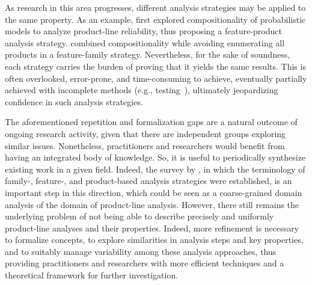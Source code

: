 As research in this area progresses, different analysis strategies may be applied to the same property. As an example, 
 \citet{Ghezzi2013} first explored compositionality of probabilistic models to analyze product-line reliability, thus proposing a feature-product analysis strategy. \citet{LANNA2017} combined compositionality while avoiding enumerating all products in a feature-family strategy.
Nevertheless, for the sake of soundness, each strategy carries the burden of proving that it yields the same results. This is often overlooked, error-prone, and time-consuming to achieve, eventually partially achieved with incomplete methods (e.g., testing~\cite{SPLLift}), ultimately jeopardizing confidence in such analysis strategies.


%
%



The aforementioned repetition and formalization gaps are a natural outcome of ongoing research activity, given that
there are independent groups exploring similar issues. Nonetheless,
practitioners and researchers would benefit from having an integrated
body of knowledge. So, it is useful to periodically synthesize
existing work in a given field.
Indeed, the survey by \citet{Thum2014}, in which the terminology of family-, feature-, and product-based analysis strategies were established, is an important step
in this direction, which could be seen as a coarse-grained domain analysis of the domain of product-line analysis.
However, there still remains the underlying problem of not being able to describe precisely and uniformly product-line analyses and their properties. Indeed, more refinement is necessary to formalize concepts, to explore similarities in analysis steps and key properties, and to 
suitably manage variability among these analysis approaches, thus providing
practitioners and researchers with more efficient techniques and a theoretical framework for further investigation.



